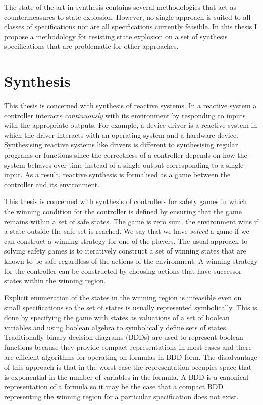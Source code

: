 The state of the art in synthesis contains several methodologies that act as countermeasures to state explosion. However, no single approach is suited to all classes of specifications nor are all specifications currently feasible. In this thesis I propose a methodology for resisting state explosion on a set of synthesis specifications that are problematic for other approaches.

\section{Synthesis}

This thesis is concerned with synthesis of reactive systems. In a reactive system a controller interacts \emph{continuously} with its environment by responding to inputs with the appropriate outputs. For example, a device driver is a reactive system in which the driver interacts with an operating system and a hardware device. Synthesising reactive systems like drivers is different to synthesising regular programs or functions since the correctness of a controller depends on how the system behaves over time instead of a single output corresponding to a single input. As a result, reactive synthesis is formalised as a game between the controller and its environment.

This thesis is concerned with synthesis of controllers for safety games in which the winning condition for the controller is defined by ensuring that the game remains within a set of safe states. The game is zero sum, the environment wins if a state outside the safe set is reached. We say that we have \emph{solved} a game if we can construct a winning strategy for one of the players. The usual approach to solving safety games is to iteratively construct a set of winning states that are known to be safe regardless of the actions of the environment. A winning strategy for the controller can be constructed by choosing actions that have successor states within the winning region.

Explicit enumeration of the states in the winning region is infeasible even on small specifications so the set of states is usually represented symbolically. This is done by specifying the game with states as valuations of a set of boolean variables and using boolean algebra to symbolically define sets of states. Traditionally binary decision diagrams (BDDs) are used to represent boolean functions because they provide compact representations in most cases and there are efficient algorithms for operating on formulas in BDD form. The disadvantage of this approach is that in the worst case the representation occupies space that is exponential in the number of variables in the formula. A BDD is a canonical representation of a formula so it may be the case that a compact BDD representing the winning region for a particular specification does not exist.


